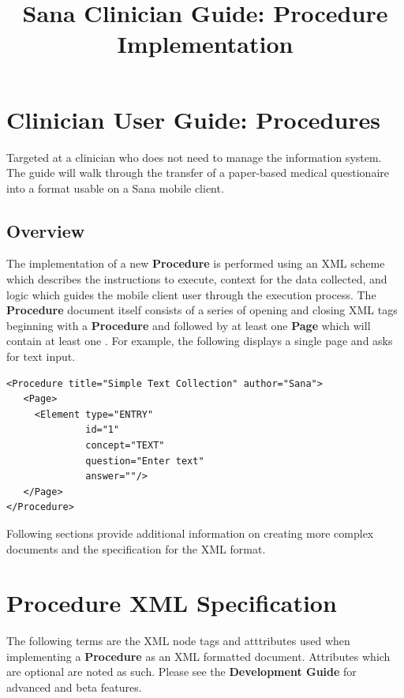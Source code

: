 \documentclass[a4paper,10pt]{article}
\title{Sana Clinician Guide: Procedure Implementation}
\author{}
\begin{document}
\maketitle

\begin{abstract}

\end{abstract}

\section{Clinician User Guide: Procedures}
Targeted at a clinician who does not need to manage the information system. The 
guide will walk through the transfer of a paper-based medical questionaire into 
a format usable on a Sana mobile client. 

\subsection{Overview}
The implementation of a new \textbf{Procedure} is performed using an XML scheme 
which describes the instructions to execute, context for the data collected, and
logic which guides the mobile client user through the execution process. The 
\textbf{Procedure} document itself consists of a series of opening and closing
XML tags beginning with a \textbf{Procedure} and followed by at least one
\textbf{Page} which will contain at least one . For example,
the following displays a single page and asks for text input.

\begin{verbatim}
<Procedure title="Simple Text Collection" author="Sana">
   <Page> 
     <Element type="ENTRY"
              id="1"
              concept="TEXT"
              question="Enter text" 
              answer=""/>
   </Page>
</Procedure>
\end{verbatim}

Following sections provide additional information on creating more complex
documents and the specification for the XML format.

\section{Procedure XML Specification} 
The following terms are the XML node tags and atttributes used when implementing
a \textbf{Procedure} as an XML formatted document. Attributes which are optional
are noted as such. Please see the \textbf{Development Guide} for advanced and 
beta features.
\end{document}
